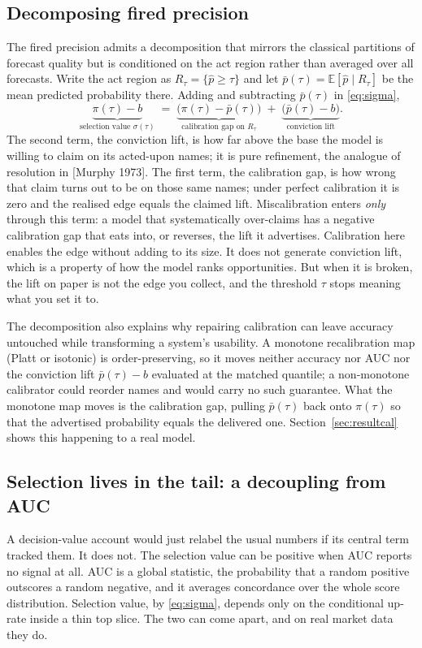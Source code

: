 \documentclass[10pt,a4paper,oneside]{article}
\theoremstyle{definition}
\theoremstyle{plain}
\newcommand{\Pup}{\hat p}
\begin{document}
\subsection{Decomposing fired precision}
\label{sec:decomp}
The fired precision admits a decomposition that mirrors the classical partitions of
forecast quality but is conditioned on the act region rather than averaged over all
forecasts. Write the act region as $R_\tau=\{\Pup\ge\tau\}$ and let
$\bar p(\tau)=\mathbb E[\Pup\mid R_\tau]$ be the mean predicted probability there.
Adding and subtracting $\bar p(\tau)$ in \eqref{eq:sigma},
\begin{equation}
\label{eq:partition}
\underbrace{\pi(\tau)-b}_{\text{selection value }\sigma(\tau)}
\;=\;
\underbrace{\big(\pi(\tau)-\bar p(\tau)\big)}_{\text{calibration gap on }R_\tau}
\;+\;
\underbrace{\big(\bar p(\tau)-b\big)}_{\text{conviction lift}} .
\end{equation}
The second term, the conviction lift, is how far above the base the model is willing
to claim on its acted-upon names; it is pure refinement, the analogue of resolution
in [Murphy 1973]. The first term, the calibration gap, is how wrong that claim turns
out to be on those same names; under perfect calibration it is zero and the realised
edge equals the claimed lift. Miscalibration enters \emph{only} through this term: a
model that systematically over-claims has a negative calibration gap that eats into,
or reverses, the lift it advertises. Calibration here enables the edge without adding
to its size. It does not generate conviction lift, which is a property of how the
model ranks opportunities. But when it is broken, the lift on paper is not the edge
you collect, and the threshold $\tau$ stops meaning what you set it to.

The decomposition also explains why repairing calibration can leave accuracy
untouched while transforming a system's usability. A monotone recalibration map (Platt
or isotonic) is order-preserving, so it moves neither accuracy nor AUC nor the
conviction lift $\bar p(\tau)-b$ evaluated at the matched quantile; a non-monotone
calibrator could reorder names and would carry no such guarantee. What the monotone
map moves is the calibration gap, pulling $\bar p(\tau)$ back onto $\pi(\tau)$ so that
the advertised probability equals the delivered one. Section~\ref{sec:resultcal} shows
this happening to a real model.

\subsection{Selection lives in the tail: a decoupling from AUC}
\label{sec:tail}
A decision-value account would just relabel the usual numbers if its central term
tracked them. It does not. The selection value can be positive when AUC reports no
signal at all. AUC is a global statistic, the probability that a random positive
outscores a random negative, and it averages concordance over the whole score
distribution. Selection value, by \eqref{eq:sigma}, depends only on the conditional
up-rate inside a thin top slice. The two can come apart, and on real market data they
do.
\end{document}
